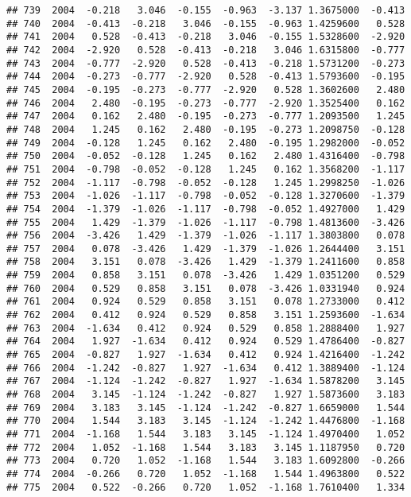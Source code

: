 \documentclass[]{article}
\begin{document}
\begin{verbatim}
## 739  2004  -0.218   3.046  -0.155  -0.963  -3.137 1.3675000  -0.413
## 740  2004  -0.413  -0.218   3.046  -0.155  -0.963 1.4259600   0.528
## 741  2004   0.528  -0.413  -0.218   3.046  -0.155 1.5328600  -2.920
## 742  2004  -2.920   0.528  -0.413  -0.218   3.046 1.6315800  -0.777
## 743  2004  -0.777  -2.920   0.528  -0.413  -0.218 1.5731200  -0.273
## 744  2004  -0.273  -0.777  -2.920   0.528  -0.413 1.5793600  -0.195
## 745  2004  -0.195  -0.273  -0.777  -2.920   0.528 1.3602600   2.480
## 746  2004   2.480  -0.195  -0.273  -0.777  -2.920 1.3525400   0.162
## 747  2004   0.162   2.480  -0.195  -0.273  -0.777 1.2093500   1.245
## 748  2004   1.245   0.162   2.480  -0.195  -0.273 1.2098750  -0.128
## 749  2004  -0.128   1.245   0.162   2.480  -0.195 1.2982000  -0.052
## 750  2004  -0.052  -0.128   1.245   0.162   2.480 1.4316400  -0.798
## 751  2004  -0.798  -0.052  -0.128   1.245   0.162 1.3568200  -1.117
## 752  2004  -1.117  -0.798  -0.052  -0.128   1.245 1.2998250  -1.026
## 753  2004  -1.026  -1.117  -0.798  -0.052  -0.128 1.3270600  -1.379
## 754  2004  -1.379  -1.026  -1.117  -0.798  -0.052 1.4927000   1.429
## 755  2004   1.429  -1.379  -1.026  -1.117  -0.798 1.4813600  -3.426
## 756  2004  -3.426   1.429  -1.379  -1.026  -1.117 1.3803800   0.078
## 757  2004   0.078  -3.426   1.429  -1.379  -1.026 1.2644400   3.151
## 758  2004   3.151   0.078  -3.426   1.429  -1.379 1.2411600   0.858
## 759  2004   0.858   3.151   0.078  -3.426   1.429 1.0351200   0.529
## 760  2004   0.529   0.858   3.151   0.078  -3.426 1.0331940   0.924
## 761  2004   0.924   0.529   0.858   3.151   0.078 1.2733000   0.412
## 762  2004   0.412   0.924   0.529   0.858   3.151 1.2593600  -1.634
## 763  2004  -1.634   0.412   0.924   0.529   0.858 1.2888400   1.927
## 764  2004   1.927  -1.634   0.412   0.924   0.529 1.4786400  -0.827
## 765  2004  -0.827   1.927  -1.634   0.412   0.924 1.4216400  -1.242
## 766  2004  -1.242  -0.827   1.927  -1.634   0.412 1.3889400  -1.124
## 767  2004  -1.124  -1.242  -0.827   1.927  -1.634 1.5878200   3.145
## 768  2004   3.145  -1.124  -1.242  -0.827   1.927 1.5873600   3.183
## 769  2004   3.183   3.145  -1.124  -1.242  -0.827 1.6659000   1.544
## 770  2004   1.544   3.183   3.145  -1.124  -1.242 1.4476800  -1.168
## 771  2004  -1.168   1.544   3.183   3.145  -1.124 1.4970400   1.052
## 772  2004   1.052  -1.168   1.544   3.183   3.145 1.1187950   0.720
## 773  2004   0.720   1.052  -1.168   1.544   3.183 1.6092800  -0.266
## 774  2004  -0.266   0.720   1.052  -1.168   1.544 1.4963800   0.522
## 775  2004   0.522  -0.266   0.720   1.052  -1.168 1.7610400   1.334

\end{verbatim}
\end{document}
